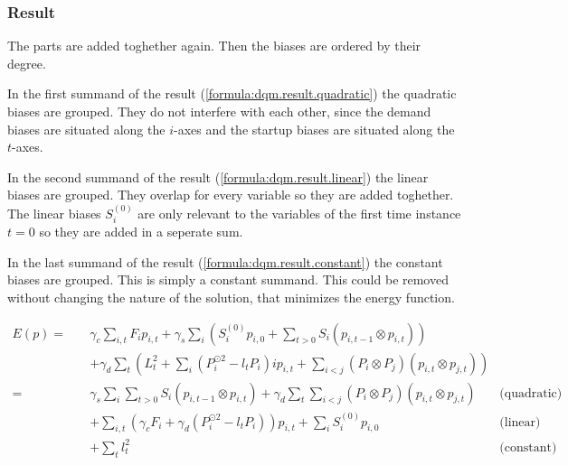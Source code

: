 \subsubsection{Result}

The parts are added toghether again.
Then the biases are ordered by their degree.

In the first summand of the result (\ref{formula:dqm.result.quadratic}) the quadratic biases are grouped.
They do not interfere with each other, since the demand biases are situated along the $i$-axes and the startup biases are situated along the $t$-axes.

In the second summand of the result (\ref{formula:dqm.result.linear}) the linear biases are grouped.
They overlap for every variable so they are added toghether.
The linear biases $S_i^{(0)}$ are only relevant to the variables of the first time instance $t = 0$ so they are added in a seperate sum.

In the last summand of the result (\ref{formula:dqm.result.constant}) the constant biases are grouped.
This is simply a constant summand.
This could be removed without changing the nature of the solution, that minimizes the energy function.

\begin{subequations}
\begin{align}
  E(p) = \quad
  &
  \gamma_c \sum_{i, t} F_i p_{i, t}
  + \gamma_s \sum_i \left(
      S_i^{(0)} p_{i, 0}
      + \sum_{t > 0} S_i \left( p_{i, t-1} \otimes p_{i, t} \right)
    \right)
  \\ &
  + \gamma_d \sum_t \left(
    L_t^2
    + \sum_i \left( P_i^{\odot 2} - l_t P_i \right)i p_{i, t}
    + \sum_{i < j} \left( P_i \otimes P_j \right) \left( p_{i, t} \otimes p_{j, t} \right)
  \right) \\
  = \quad
  &
  \gamma_s \sum_i \sum_{t > 0} S_i \left( p_{i, t-1} \otimes p_{i, t} \right)
  + \gamma_d \sum_t \sum_{i < j} \left( P_i \otimes P_j \right) \left( p_{i, t} \otimes p_{j, t} \right)
  & \text{(quadratic)}
  \label{formula:dqm.result.quadratic}
  \\ &
  + \sum_{i, t} \left(
    \gamma_c F_i + \gamma_d \left(P_i^{\odot 2} - l_t P_i \right)
  \right) p_{i, t}
  + \sum_i S_i^{(0)} p_{i, 0}
  & \text{(linear)}
  \label{formula:dqm.result.linear}
  \\ &
  + \sum_t l_t^2
  & \text{(constant)}
  \label{formula:dqm.result.constant}
\end{align}
\end{subequations}
